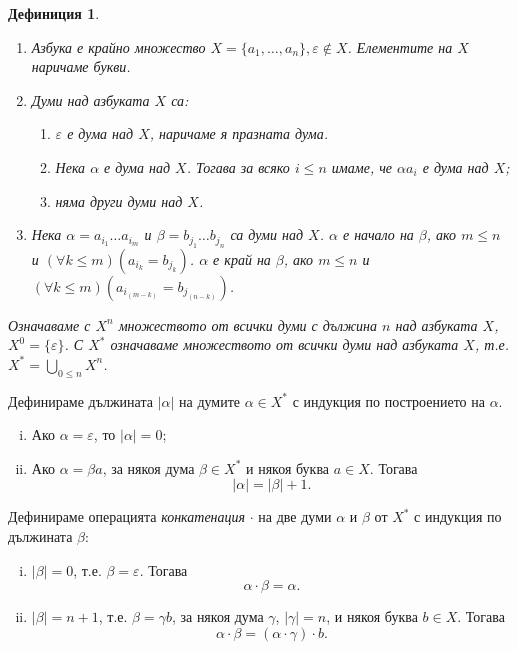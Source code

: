 \documentclass[a4paper]{article}
\newtheorem{dfn}{Дефиниция}
\begin{document}
\begin{dfn}
  \begin{enumerate}
  \item
    Азбука е крайно множество $X = \{a_1,\dots,a_n\}, \varepsilon\not\in X$.
    Елементите на $X$ наричаме букви.
  \item
    Думи над азбуката $X$ са:
    \begin{enumerate}
    \item
      $\varepsilon$ е дума над $X$, наричаме я празната дума.
    \item
      Нека $\alpha$ е дума над $X$. 
      Тогава за всяко $i\leq n$ имаме, че $\alpha a_i$ е дума над $X$;
    \item
      няма други думи над $X$.
    \end{enumerate}
  \item
    Нека $\alpha=a_{i_1}\dots a_{i_m}$ и $\beta=b_{j_1}\dots b_{j_n}$ са думи над $X$.
    $\alpha$ е начало на $\beta$, ако $m\leq n$ и $(\forall k\leq m)(a_{i_k} = b_{j_k})$.
    $\alpha$ е край на $\beta$, ако $m\leq n$ и $(\forall k\leq m)(a_{i_{(m-k)}} = b_{j_{(n-k)}})$.
  \end{enumerate}
  Означаваме с $X^n$ множеството от всички думи с дължина $n$ над азбуката $X$, $X^0 = \{\varepsilon\}$.
  С $X^{*}$ означаваме множеството от всички думи над азбуката $X$, т.е. $X^{*} = \bigcup_{0\leq n} X^{n}$.
\end{dfn}

Дефинираме дължината $|\alpha|$ на думите $\alpha \in X^*$ с индукция по построението на $\alpha$.
\begin{enumerate}[(i)]
  \item
    Ако $\alpha = \varepsilon$, то $|\alpha| = 0$;
  \item
    Ако $\alpha = \beta a$, за някоя дума $\beta\in X^*$ и някоя буква $a\in X$. Тогава \[|\alpha| = |\beta| + 1.\]
\end{enumerate}

Дефинираме операцията {\em конкатенация} $\cdot$ на две думи $\alpha$ и $\beta$ от $X^*$ с индукция по дължината $\beta$:
\begin{enumerate}[(i)]
  \item
    $|\beta| = 0$, т.е. $\beta = \varepsilon$.
    Тогава \[\alpha\cdot\beta = \alpha.\]
  \item
    $|\beta| = n+1$, т.е. $\beta = \gamma b$, за някоя дума $\gamma$, $|\gamma| = n$, и някоя буква $b\in X$.
    Тогава \[\alpha\cdot\beta = (\alpha\cdot\gamma)\cdot b.\]
\end{enumerate}
\end{document}
